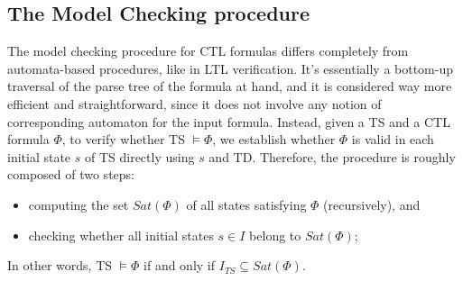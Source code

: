 \documentclass{article}
\begin{document}
\subsection{The Model Checking procedure}
\label{subsec:mc}
The model checking procedure for CTL formulas differs completely from automata-based procedures, like in LTL verification. It's essentially a bottom-up traversal of the parse tree of the formula at hand, and it is considered way more efficient and straightforward, since it does not involve any notion of corresponding automaton for the input formula. Instead, given a TS and a CTL formula $\Phi$, to verify whether TS $\vDash \Phi$, we establish whether $\Phi$ is valid in each initial state $s$ of TS directly using $s$ and TD. 
Therefore, the procedure is roughly composed of two steps: 
\begin{itemize}
    \item computing the set $Sat(\Phi)$ of all states satisfying $\Phi$ (recursively), and
    \item checking whether all initial states $s \in I$ belong to $Sat(\Phi)$; 
\end{itemize}
In other words, TS $\vDash \Phi$ if and only if $I_{TS} \subseteq Sat(\Phi)$.
\end{document}

